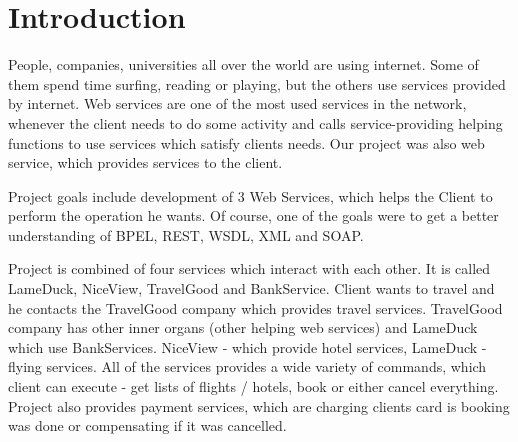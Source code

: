 \section{Introduction}

People, companies, universities all over the world are using internet. Some of them spend time surfing, reading or playing, but the others use services provided by internet. Web services are one of the most used services in the network, whenever the client needs to do some activity and calls service-providing helping functions to use services which satisfy clients needs. Our project was also web service, which provides services to the client. 

Project goals include development of 3 Web Services, which helps the Client to perform the operation he wants. Of course, one of the goals were to get a better understanding of BPEL, REST, WSDL, XML and SOAP. 

Project is combined of four services which interact with each other. It is called LameDuck, NiceView, TravelGood and BankService. Client wants to travel and he contacts the TravelGood company which provides travel services. TravelGood company has other inner organs (other helping web services) and LameDuck which use BankServices. NiceView - which provide hotel services, LameDuck - flying services. All of the services provides a wide variety of commands, which client can execute - get lists of flights / hotels, book or either cancel everything. Project also provides payment services, which are charging clients card is booking was done or compensating if it was cancelled.
